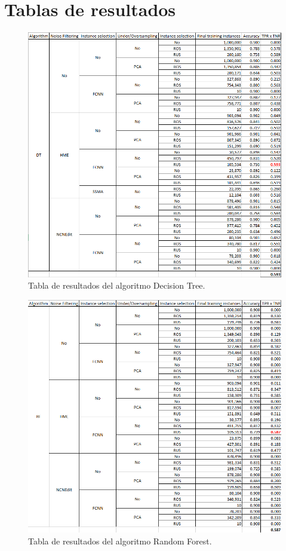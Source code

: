 \section{Tablas de resultados}

\begin{figure}[ht]
    \centerfloat
    \includegraphics[width=1.2\textwidth]{img/dt.png}
    \caption{Tabla de resultados del algoritmo Decision Tree.}
\end{figure}

\begin{figure}[ht]
    \centerfloat
    \includegraphics[width=1.2\textwidth]{img/rf.png}
    \caption{Tabla de resultados del algoritmo Random Forest.}
\end{figure}

